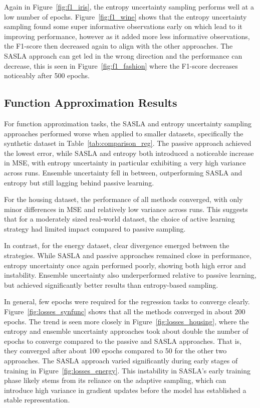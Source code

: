 \documentclass[10pt, conference]{IEEEtran}
\begin{document}
Again in Figure~\ref{fig:f1_iris}, the entropy uncertainty sampling performs well at a low number of epochs. Figure~\ref{fig:f1_wine} shows that the entropy uncertainty sampling found some super informative observations early on which lead to it improving performance, however as it added more less informative observations, the F1-score then decreased again to align with the other approaches. The SASLA approach can get led in the wrong direction and the performance can decrease, this is seen in Figure~\ref{fig:f1_fashion} where the F1-score decreases noticeably after 500 epochs.




\subsection{Function Approximation Results}

For function approximation tasks, the SASLA and entropy uncertainty sampling approaches performed worse when applied to smaller datasets, specifically the synthetic dataset in Table~\ref{tab:comparison_reg}. The passive approach achieved the lowest error, while SASLA and entropy both introduced a noticeable increase in MSE, with entropy uncertainty in particular exhibiting a very high variance across runs. Ensemble uncertainty fell in between, outperforming SASLA and entropy but still lagging behind passive learning.

For the housing dataset, the performance of all methods converged, with only minor differences in MSE and relatively low variance across runs. This suggests that for a moderately sized real-world dataset, the choice of active learning strategy had limited impact compared to passive sampling.

In contrast, for the energy dataset, clear divergence emerged between the strategies. While SASLA and passive approaches remained close in performance, entropy uncertainty once again performed poorly, showing both high error and instability. Ensemble uncertainty also underperformed relative to passive learning, but achieved significantly better results than entropy-based sampling.

In general, few epochs were required for the regression tasks to converge clearly. Figure~\ref{fig:losses_synfunc} shows that all the methods converged in about 200 epochs. The trend is seen more closely in Figure~\ref{fig:losses_housing}, where the entropy and ensemble uncertainty approaches took about double the number of epochs to converge compared to the passive and SASLA approaches. That is, they converged after about 100 epochs compared to 50 for the other two approaches. The SASLA approach varied significantly during early stages of training in Figure~\ref{fig:losses_energy}. This instability in SASLA’s early training phase likely stems from its reliance on the adaptive sampling, which can introduce high variance in gradient updates before the model has established a stable representation.
\end{document}
